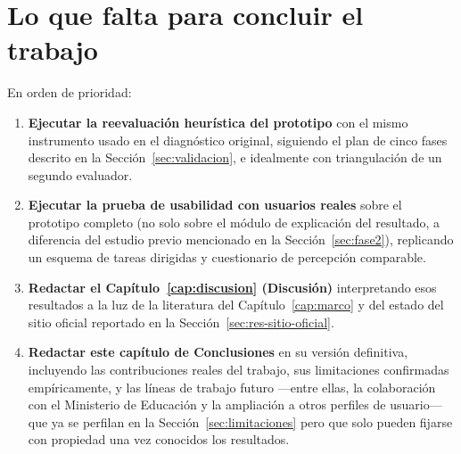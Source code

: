 \section*{Lo que falta para concluir el trabajo}

En orden de prioridad:

\begin{enumerate}
    \item \textbf{Ejecutar la reevaluación heurística del prototipo} con el mismo instrumento usado en el diagnóstico original, siguiendo el plan de cinco fases descrito en la Sección~\ref{sec:validacion}, e idealmente con triangulación de un segundo evaluador.
    \item \textbf{Ejecutar la prueba de usabilidad con usuarios reales} sobre el prototipo completo (no solo sobre el módulo de explicación del resultado, a diferencia del estudio previo mencionado en la Sección~\ref{sec:fase2}), replicando un esquema de tareas dirigidas y cuestionario de percepción comparable.
    \item \textbf{Redactar el Capítulo~\ref{cap:discusion} (Discusión)} interpretando esos resultados a la luz de la literatura del Capítulo~\ref{cap:marco} y del estado del sitio oficial reportado en la Sección~\ref{sec:res-sitio-oficial}.
    \item \textbf{Redactar este capítulo de Conclusiones} en su versión definitiva, incluyendo las contribuciones reales del trabajo, sus limitaciones confirmadas empíricamente, y las líneas de trabajo futuro —entre ellas, la colaboración con el Ministerio de Educación y la ampliación a otros perfiles de usuario— que ya se perfilan en la Sección~\ref{sec:limitaciones} pero que solo pueden fijarse con propiedad una vez conocidos los resultados.
\end{enumerate}
